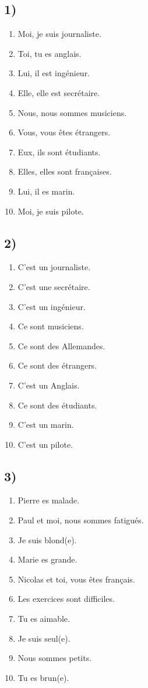 \subsection*{1)}

\begin{enumerate}
    \item Moi, je suis journaliste.
    \item Toi, tu es anglais.
    \item Lui, il est ingénieur.
    \item Elle, elle est secrétaire.
    \item Nous, nous sommes musiciens.
    \item Vous, vous êtes étrangers.
    \item Eux, ils sont étudiants.
    \item Elles, elles sont françaises.
    \item Lui, il es marin.
    \item Moi, je suis pilote.
\end{enumerate}

\subsection*{2)}

\begin{enumerate}
    \item C'est un journaliste.
    \item C'est une secrétaire.
    \item C'est un ingénieur.
    \item Ce sont musiciens.
    \item Ce sont des Allemandes.
    \item Ce sont des étrangers.
    \item C'est un Anglais.
    \item Ce sont des étudiants.
    \item C'est un marin.
    \item C'est un pilote.
\end{enumerate}

\subsection*{3)}

\begin{enumerate}
    \item Pierre es malade.
    \item Paul et moi, nous sommes fatigués.
    \item Je suis blond(e).
    \item Marie es grande.
    \item Nicolas et toi, vous êtes français.
    \item Les exercices sont difficiles.
    \item Tu es aimable.
    \item Je suis seul(e).
    \item Nous sommes petits.
    \item Tu es brun(e).
\end{enumerate}

